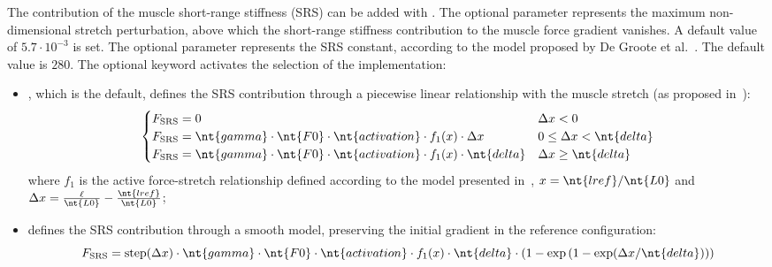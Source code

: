 The contribution of the muscle short-range stiffness (SRS) can be added with . The optional  parameter  represents the maximum non-dimensional
stretch perturbation, above which the short-range stiffness contribution to the muscle
force gradient vanishes. A default value of $5.7\cdot10^{-3}$ is set. The optional
parameter  represents the SRS constant, according to the model proposed by
De Groote et al.~\cite{DEGROOTE-2017-SRS}. The default value is $280$.
The optional keyword  activates the selection of the implementation: 
\begin{itemize}
  \item {}, which is the default, defines the SRS contribution through a
    piecewise linear relationship with the muscle stretch 
    (as proposed in~\cite{DEGROOTE-2017-SRS}):
    \begin{equation}
      \begin{cases}
        F_{\text{SRS}} = 0 &\Delta x < 0 \\
        F_{\text{SRS}} = 
          \nt{gamma}
          \cdot 
          \nt{F0} 
          \cdot 
          \nt{activation} 
          \cdot 
          f_1(x)
          \cdot
          \Delta x
          & 0 \leq \Delta x < \nt{delta}
        \\
        F_{\text{SRS}} = 
          \nt{gamma}
          \cdot 
          \nt{F0} 
          \cdot 
          \nt{activation} 
          \cdot 
          f_1(x)
          \cdot
          \nt{delta}
          & \Delta x \ge \nt{delta}
      \end{cases}
    \end{equation}
    where $f_1$ is the active force-stretch relationship defined according to the model
    presented in~\cite{PENNESTRI-2007-JB}, $x = \nt{lref}/\nt{L0}$ and 
    $\Delta x = \frac{\ell}{\nt{L0}} - \frac{\nt{lref}}{\nt{L0}}$;
  \item {} defines the SRS contribution through a smooth model, preserving
    the initial gradient in the reference configuration:
    \begin{equation}
      F_{\text{SRS}} = 
      \text{step}(\Delta x) 
      \cdot
      \nt{gamma} 
      \cdot
      \nt{F0}
      \cdot
      \nt{activation} 
      \cdot
      f_1(x)
      \cdot
      \nt{delta}
      \cdot
      \left(
        1 - \text{exp}
        \left(
          1 - \text{exp}(\Delta x/\nt{delta})
        \right)
      \right)
    \end{equation}
\end{itemize}

